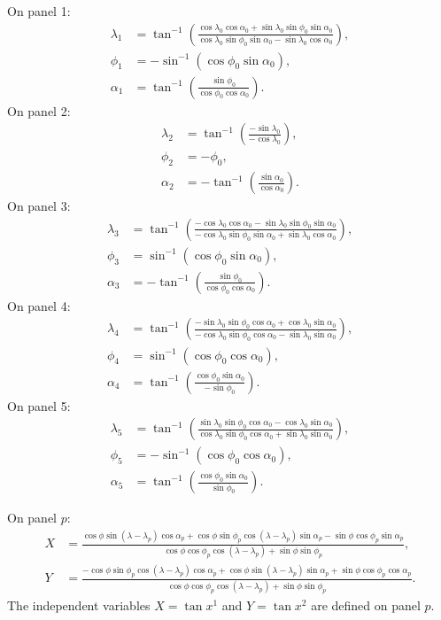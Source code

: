 \documentclass{article}
\begin{document}
On panel 1:
\begin{align}
\lambda_1&=\tan^{-1}\left(\frac{\cos\lambda_0\cos\alpha_0+\sin\lambda_0\sin\phi_0\sin\alpha_0}{\cos\lambda_0\sin\phi_0\sin\alpha_0-\sin\lambda_0\cos\alpha_0}\right), \\
\phi_1&=-\sin^{-1}\left(\cos\phi_0\sin\alpha_0\right), \\
\alpha_1&=\tan^{-1}\left(\frac{\sin\phi_0}{\cos\phi_0\cos\alpha_0}\right).
\end{align}
On panel 2:
\begin{align}
\lambda_2&=\tan^{-1}\left(\frac{-\sin\lambda_0}{-\cos\lambda_0}\right), \\
\phi_2&=-\phi_0, \\
\alpha_2&=-\tan^{-1}\left(\frac{\sin\alpha_0}{\cos\alpha_0}\right).
\end{align}
On panel 3:
\begin{align}
\lambda_3&=\tan^{-1}\left(\frac{-\cos\lambda_0\cos\alpha_0-\sin\lambda_0\sin\phi_0\sin\alpha_0}{-\cos\lambda_0\sin\phi_0\sin\alpha_0+\sin\lambda_0\cos\alpha_0}\right), \\
\phi_3&=\sin^{-1}\left(\cos\phi_0\sin\alpha_0\right), \\
\alpha_3&=-\tan^{-1}\left(\frac{\sin\phi_0}{\cos\phi_0\cos\alpha_0}\right).
\end{align}
On panel 4:
\begin{align}
\lambda_4&=\tan^{-1}\left(\frac{-\sin\lambda_0\sin\phi_0\cos\alpha_0+\cos\lambda_0\sin\alpha_0}{-\cos\lambda_0\sin\phi_0\cos\alpha_0-\sin\lambda_0\sin\alpha_0}\right), \\
\phi_4&=\sin^{-1}\left(\cos\phi_0\cos\alpha_0\right), \\
\alpha_4&=\tan^{-1}\left(\frac{\cos\phi_0\sin\alpha_0}{-\sin\phi_0}\right).
\end{align}
On panel 5:
\begin{align}
\lambda_5&=\tan^{-1}\left(\frac{\sin\lambda_0\sin\phi_0\cos\alpha_0-\cos\lambda_0\sin\alpha_0}{\cos\lambda_0\sin\phi_0\cos\alpha_0+\sin\lambda_0\sin\alpha_0}\right), \\
\phi_5&=-\sin^{-1}\left(\cos\phi_0\cos\alpha_0\right), \\
\alpha_5&=\tan^{-1}\left(\frac{\cos\phi_0\sin\alpha_0}{\sin\phi_0}\right).
\end{align}

On panel $p$:
\begin{align}
X&=\frac{ \cos\phi\sin(\lambda-\lambda_p)\cos\alpha_p + \cos\phi\sin\phi_p\cos(\lambda-\lambda_p)\sin\alpha_p - \sin\phi\cos\phi_p\sin\alpha_p }   {\cos\phi\cos\phi_p\cos(\lambda-\lambda_p)+\sin\phi\sin\phi_p}, \\
Y&=\frac{ - \cos\phi\sin\phi_p\cos(\lambda-\lambda_p)\cos\alpha_p + \cos\phi\sin(\lambda-\lambda_p)\sin\alpha_p + \sin\phi\cos\phi_p\cos\alpha_p  }  {\cos\phi\cos\phi_p\cos(\lambda-\lambda_p)+\sin\phi\sin\phi_p}.
\end{align}
The independent variables $X=\tan x^1$ and $Y=\tan x^2$ are defined on panel $p$.
\end{document}
